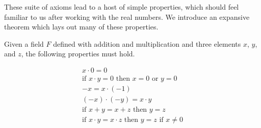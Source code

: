 These suite of axioms lead to a host of simple properties, which should feel familiar to us after working with the real numbers. We introduce an expansive theorem which lays out many of these properties.

\vspace{\baselineskip}
\begin{theorem}
	Given a field $F$ defined with addition and multiplication and three elements $x$, $y$, and $z$, the following properties must hold.
	
	\begin{align}
		x \cdot 0 = 0 \\
		\text{if } x \cdot y = 0 \text{ then } x = 0 \text { or } y = 0 \\
		-x = x \cdot (-1) \\
		(-x) \cdot (-y) = x \cdot y \\
		\text{if } x + y = x + z \text{ then } y = z \\
		\text{if } x \cdot y = x \cdot z \text{ then } y = z \text { if } x \neq 0
	\end{align}
\end{theorem}


